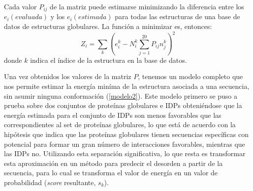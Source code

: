 Cada valor $P_{ij}$ de la matriz puede estimarse minimizando la diferencia entre los $e_i(evaluada)$ y los $e_i(estimada)$ para todas las estructuras de una base de datos de estructuras globulares.
La función a minimizar es, entonces: 
\begin{equation}\label{z}
Z_i = \sum_{k} (e_i^k - N_i^k\sum_{j=1}^{20} P_{ij}n_{j}^k)^2   
\end{equation}
\noindent donde $k$ indica el índice de la estructura en la base de datos. 



Una vez obtenidos los valores de la matriz $P$, tenemos un modelo completo que nos permite estimar la energía miníma de la estructura asociada a una secuencia, sin asumir ninguna conformación (\ref{modelo2}).
Este modelo primero se puso a prueba sobre dos conjuntos de proteínas globulares e IDPs obteniéndose que la energía estimada para el conjunto de IDPs son menos favorables que las correspondientes al set de proteínas globulares,
lo que está de acuerdo con la hipótesis que indica que las proteínas globulares tienen secuencias específicas con potencial para formar un gran número de interacciones favorables, mientras que las IDPs no.
Utilizando esta separación significativa, lo que resta es transformar esta aproximación en un método para predecir el desorden a partir de la secuencia, 
para lo cual se transforma el valor de energía en un valor de probabilidad (\textit{score} resultante, $s_k$).




